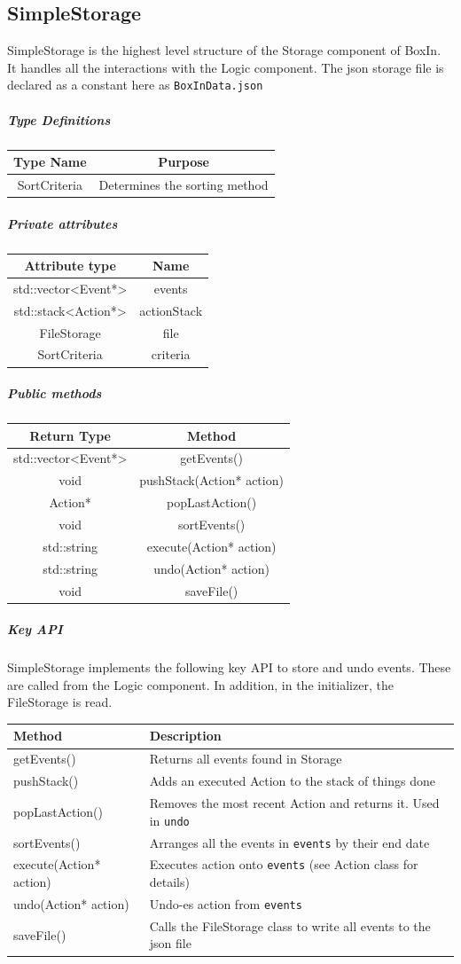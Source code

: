 \documentclass[12pt]{extarticle}
\begin{document}
\subsection{SimpleStorage}
SimpleStorage is the highest level structure of the Storage component of BoxIn. It handles all the interactions with the Logic component. The json storage file is declared as a constant here as \texttt{BoxInData.json}
\subparagraph{Type Definitions}
\begin{tabular}{c c}
Type Name & Purpose\\
\hline
SortCriteria & Determines the sorting method\\
\end{tabular}
\subparagraph{Private attributes}
\begin{tabular}{c c}
Attribute type & Name\\
\hline
std::vector<Event*> & events\\
std::stack<Action*> & actionStack\\
FileStorage & file\\
SortCriteria & criteria \\
\end{tabular}
\subparagraph{Public methods}
\begin{tabular}{c c}
Return Type & Method\\
\hline
std::vector<Event*> & getEvents()\\
void & pushStack(Action* action)\\
Action* & popLastAction()\\
void & sortEvents()\\
std::string & execute(Action* action)\\
std::string & undo(Action* action)\\
void & saveFile()\\
\end{tabular}
\subparagraph{Key API}
SimpleStorage implements the following key API to store and undo events. These are called from the Logic component. In addition, in the initializer, the FileStorage is read.\\
\begin{tabular}{p{6cm} p{12cm}}
Method & Description\\
\hline
getEvents() & Returns all events found in Storage\\
pushStack() & Adds an executed Action to the stack of things done\\
popLastAction() & Removes the most recent Action and returns it. Used in \texttt{undo}\\
sortEvents() & Arranges all the events in \texttt{events} by their end date\\
execute(Action* action) & Executes action onto \texttt{events} (see Action class for details)\\ 
undo(Action* action) & Undo-es action from \texttt{events}\\
saveFile() & Calls the FileStorage class to write all events to the json file\\
\end{tabular}
\end{document}
